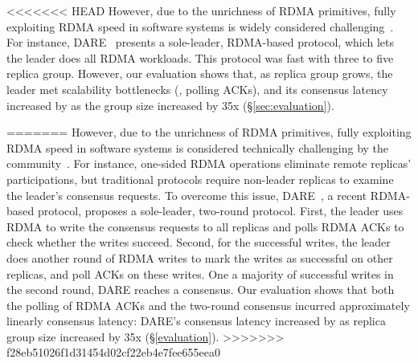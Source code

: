 <<<<<<< HEAD
However, due to the unrichness of RDMA primitives, fully exploiting RDMA 
speed in software systems is widely 
considered challenging~\cite{pilaf:usenix14,herd:sigcomm14,
farm:sosp15,dare:hpdc15}. For instance, DARE~\cite{dare:hpdc15} presents a 
sole-leader, RDMA-based \paxos protocol, which lets the leader does all 
RDMA workloads. This protocol was fast with three to five replica group. 
However, our evaluation shows that, as replica group grows, the leader met 
scalability bottlenecks (\eg, polling ACKs), and its consensus latency 
increased by \darescalability as the group size increased by 35x 
(\S\ref{sec:evaluation}).


=======
However, due to the unrichness of RDMA primitives, fully exploiting RDMA
speed in software systems is considered technically challenging by the
community~\cite{pilaf:usenix14,herd:sigcomm14,dare:hpdc15,farm:sosp15}. For
instance, one-sided RDMA operations eliminate remote replicas' participations,
but traditional \paxos protocols require non-leader replicas to examine the
leader's consensus requests. To overcome this issue, DARE~\cite{dare:hpdc15}, a
recent RDMA-based \paxos protocol, proposes a sole-leader, two-round protocol.
First, the leader uses RDMA to write the consensus requests to all replicas and
polls RDMA ACKs to check whether the writes succeed. Second, for the successful
writes, the leader does another round of RDMA writes to mark the writes as
successful on other replicas, and poll ACKs on these writes. One a majority of
successful writes in the second round, DARE reaches a consensus. Our evaluation
shows that both the polling of RDMA ACKs and the two-round consensus incurred
approximately linearly consensus latency: DARE's consensus latency increased by
\darescalability as replica group size increased by 35x (\S\ref{evaluation}).
>>>>>>> f28eb51026f1d31454d02cf22eb4e7fee655eea0

